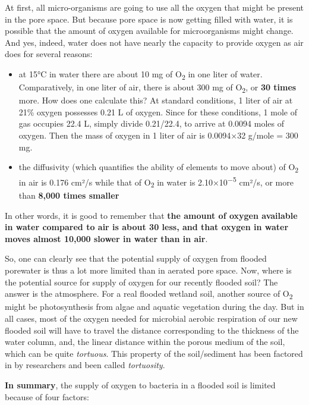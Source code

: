 \documentclass[]{book}
\providecommand{\tightlist}{%
  \setlength{\itemsep}{0pt}\setlength{\parskip}{0pt}}
\theoremstyle{definition}
\theoremstyle{definition}
\theoremstyle{definition}
\theoremstyle{remark}
\begin{document}
At first, all micro-organisms are going to use all the oxygen that might
be present in the pore space. But because pore space is now getting
filled with water, it is possible that the amount of oxygen available
for microorganisms might change. And yes, indeed, water does not have
nearly the capacity to provide oxygen as air does for several reasons:

\begin{itemize}
\tightlist
\item
  at 15°C in water there are about 10 mg of O\textsubscript{2} in one
  liter of water. Comparatively, in one liter of air, there is about 300
  mg of O\textsubscript{2}, or \textbf{30 times} more. How does one
  calculate this? At standard conditions, 1 liter of air at 21\% oxygen
  possesses 0.21 L of oxygen. Since for these conditions, 1 mole of gas
  occupies 22.4 L, simply divide 0.21/22.4, to arrive at 0.0094 moles of
  oxygen. Then the mass of oxygen in 1 liter of air is 0.0094×32 g/mole
  = 300 mg.
\item
  the diffusivity (which quantifies the ability of elements to move
  about) of O\textsubscript{2} in air is 0.176 cm²/s while that of
  O\textsubscript{2} in water is 2.10×10\textsuperscript{−5} cm²/s, or
  more than \textbf{8,000 times smaller}
  \citep{Wikipedia_contributors2017-id}
\end{itemize}

In other words, it is good to remember that \textbf{the amount of oxygen
available in water compared to air is about 30 less, and that oxygen in
water moves almost 10,000 slower in water than in air}.

So, one can clearly see that the potential supply of oxygen from flooded
porewater is thus a lot more limited than in aerated pore space. Now,
where is the potential source for supply of oxygen for our recently
flooded soil? The answer is the atmosphere. For a real flooded wetland
soil, another source of O\textsubscript{2} might be photosynthesis from
algae and aquatic vegetation during the day. But in all cases, most of
the oxygen needed for microbial aerobic respiration of our new flooded
soil will have to travel the distance corresponding to the thickness of
the water column, and, the linear distance within the porous medium of
the soil, which can be quite \emph{tortuous}. This property of the
soil/sediment has been factored in by researchers and been called
\emph{tortuosity}.

\textbf{In summary}, the supply of oxygen to bacteria in a flooded soil
is limited because of four factors:
\end{document}
